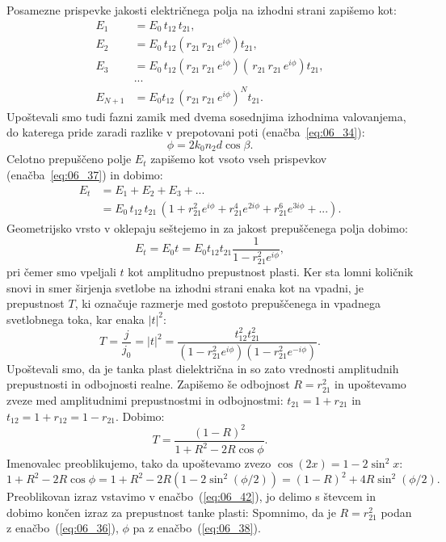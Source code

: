 Posamezne prispevke jakosti 
električnega polja na izhodni strani zapišemo kot:
\begin{align}
E_1 &= E_0\,t_{12}\,t_{21},\\
E_2 &= E_0\,t_{12}\left(r_{21}\,r_{21}\,e^{i\phi}\right)t_{21},\\
E_3 &= E_0\,t_{12}\left(r_{21}\,r_{21}\,e^{i\phi}\right)
\left(\,r_{21}\,r_{21}\,e^{i\phi}\right)t_{21},\\
&...\nonumber\\
E_{N+1} &= E_0t_{12}\,\left(r_{21}\,r_{21}\,e^{i\phi}\right)^Nt_{21}.
\label{eq:06_37}
\end{align}
Upoštevali smo tudi fazni zamik med dvema sosednjima izhodnima valovanjema, do katerega
pride zaradi razlike v prepotovani poti (enačba~\ref{eq:06_34}):
\begin{equation}
\phi = 2k_0 n_2 d \cos \beta.
\label{eq:06_38}
\end{equation}
Celotno prepuščeno polje $E_t$ zapišemo kot vsoto vseh prispevkov (enačba~\ref{eq:06_37}) 
in dobimo:
\begin{align}
E_t &= E_1+E_2+E_3+... \nonumber \\
&= E_0\, t_{12}\,t_{21}\,\left(1 + r_{21}^2 e^{i\phi} + r_{21}^4 e^{2i\phi} 
+ r_{21}^6 e^{3i\phi} + ... \right)\!\!.
\label{eq:06_39}
\end{align}
Geometrijsko vrsto v oklepaju seštejemo in za jakost prepuščenega polja dobimo:
\begin{equation}
E_t = E_0 t= E_0 t_{12}t_{21}\frac{1}{1-r_{21}^2e^{i\phi}},
\label{eq:06_40}
\end{equation}
pri čemer smo vpeljali $t$ kot amplitudno prepustnost plasti. Ker sta lomni
količnik snovi in smer širjenja svetlobe na izhodni strani enaka kot na vpadni, je 
prepustnost $T$, ki označuje razmerje med gostoto prepuščenega in vpadnega svetlobnega
toka, kar enaka $|t|^2$:
\begin{equation}
T = \frac{j}{j_0} = |t|^2= \frac{t_{12}^2t_{21}^2}{\left(1-r_{21}^2e^{i\phi}\right)
\left(1-r_{21}^2e^{-i\phi}\right)}.
\label{eq:06_41}
\end{equation}
Upoštevali smo, da je tanka plast dielektrična in so zato vrednosti amplitudnih 
prepustnosti in odbojnosti realne. Zapišemo še odbojnost $R = r_{21}^2$ in upoštevamo
zveze med amplitudnimi prepustnostmi in odbojnostmi:
$t_{21} = 1+r_{21}$ in $t_{12} = 1+r_{12} = 1-r_{21}$. Dobimo:
\begin{equation}
T = \frac{\left(1-R\right)^2}{1 + R^2 - 2R\cos \phi}.
\label{eq:06_42}
\end{equation}
Imenovalec preoblikujemo, tako da upoštevamo zvezo $\cos(2x) = 1-2\sin^2x$:
\begin{equation}
1 + R^2 - 2R\cos \phi = 1+R^2 - 2R(1-2\sin^2(\phi/2)) = (1-R)^2 + 4R \sin^2(\phi/2).
\label{eq:06_43}
\end{equation}
Preoblikovan izraz vstavimo v enačbo~(\ref{eq:06_42}), jo delimo s števcem in 
dobimo končen izraz za prepustnost tanke plasti:
Spomnimo, da je $R = r_{21}^2$ podan z enačbo~(\ref{eq:06_36}), $\phi$ pa z 
enačbo~(\ref{eq:06_38}). 

